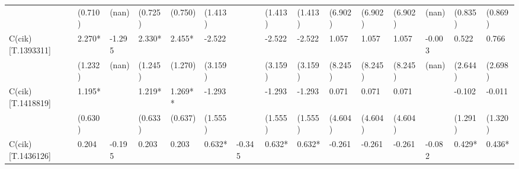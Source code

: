 \begin{table}
\begin{center}
\begin{tabular}{lllllllllllllll}
                  & (0.710)            & (nan)              & (0.725)                & (0.750)             & (1.413)              &                      & (1.413)                  & (1.413)               & (6.902)              & (6.902)                  & (6.902)               & (nan)                         & (0.835)                                   & (0.869)                                 \\
C(cik)[T.1393311] & 2.270*             & -1.295             & 2.330*                 & 2.455*              & -2.522               &                      & -2.522                   & -2.522                & 1.057                & 1.057                    & 1.057                 & -0.003                        & 0.522                                     & 0.766                                   \\
                  & (1.232)            & (nan)              & (1.245)                & (1.270)             & (3.159)              &                      & (3.159)                  & (3.159)               & (8.245)              & (8.245)                  & (8.245)               & (nan)                         & (2.644)                                   & (2.698)                                 \\
C(cik)[T.1418819] & 1.195*             &                    & 1.219*                 & 1.269**             & -1.293               &                      & -1.293                   & -1.293                & 0.071                & 0.071                    & 0.071                 &                               & -0.102                                    & -0.011                                  \\
                  & (0.630)            &                    & (0.633)                & (0.637)             & (1.555)              &                      & (1.555)                  & (1.555)               & (4.604)              & (4.604)                  & (4.604)               &                               & (1.291)                                   & (1.320)                                 \\
C(cik)[T.1436126] & 0.204              & -0.195             & 0.203                  & 0.203               & 0.632*               & -0.345               & 0.632*                   & 0.632*                & -0.261               & -0.261                   & -0.261                & -0.082                        & 0.429*                                    & 0.436*                                  \\

\end{tabular}
\end{center}
\end{table}
